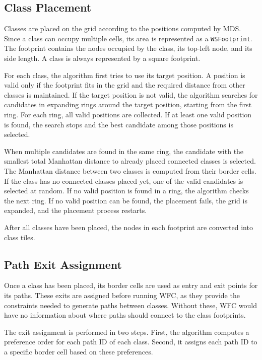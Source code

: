 \documentclass[../../main.tex]{subfiles}
\begin{document}
\subsection{Class Placement}

Classes are placed on the grid according to the positions computed by MDS. Since a class can occupy multiple cells, its area is represented as a \texttt{WSFootprint}. The footprint contains the nodes occupied by the class, its top-left node, and its side length. A class is always represented by a square footprint.

For each class, the algorithm first tries to use its target position. A position is valid only if the footprint fits in the grid and the required distance from other classes is maintained. If the target position is not valid, the algorithm searches for candidates in expanding rings around the target position, starting from the first ring. For each ring, all valid positions are collected. If at least one valid position is found, the search stops and the best candidate among those positions is selected.

When multiple candidates are found in the same ring, the candidate with the smallest total Manhattan distance to already placed connected classes is selected. The Manhattan distance between two classes is computed from their border cells. If the class has no connected classes placed yet, one of the valid candidates is selected at random. If no valid position is found in a ring, the algorithm checks the next ring. If no valid position can be found, the placement fails, the grid is expanded, and the placement process  restarts.

After all classes have been placed, the nodes in each footprint are converted into class tiles.

\subsection{Path Exit Assignment}

Once a class has been placed, its border cells are used as entry and exit points for its paths. These exits are assigned before running WFC, as they provide the constraints needed to generate paths between classes. Without these, WFC would have no information about where paths should connect to the class footprints.

The exit assignment is performed in two steps. First, the algorithm computes a preference order for each path ID of each class. Second, it assigns each path ID to a specific border cell based on these preferences.
\end{document}
